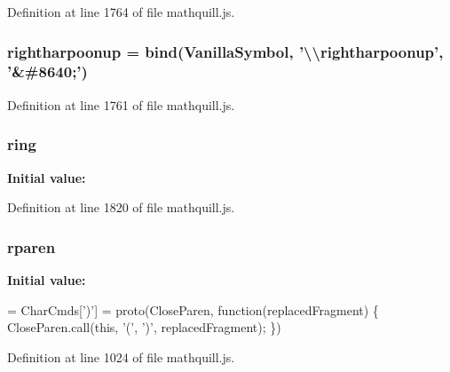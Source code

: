 Definition at line 1764 of file mathquill.\-js.

\subsubsection[{rightharpoonup}]{ rightharpoonup = {\bf bind}({\bf Vanilla\-Symbol}, '\textbackslash{}\textbackslash{}rightharpoonup', '\&\#8640;')}\label{mathquill_8js_ad91eacbbcbf84361cbc2dc736a142cf5}


Definition at line 1761 of file mathquill.\-js.

\subsubsection[{ring}]{ ring}\label{mathquill_8js_a60a52be12958b150db478faeadf29227}
{\bfseries Initial value\-:}


Definition at line 1820 of file mathquill.\-js.

\subsubsection[{rparen}]{ rparen}\label{mathquill_8js_ac2c314c37a3738b6c1b5e98f64ed2929}
{\bfseries Initial value\-:}
\begin{DoxyCode}
= CharCmds[\textcolor{charliteral}{')'}] = proto(CloseParen, \textcolor{keyword}{function}(replacedFragment) \{
  CloseParen.call(\textcolor{keyword}{this}, \textcolor{charliteral}{'('}, \textcolor{charliteral}{')'}, replacedFragment);
\})
\end{DoxyCode}


Definition at line 1024 of file mathquill.\-js.

